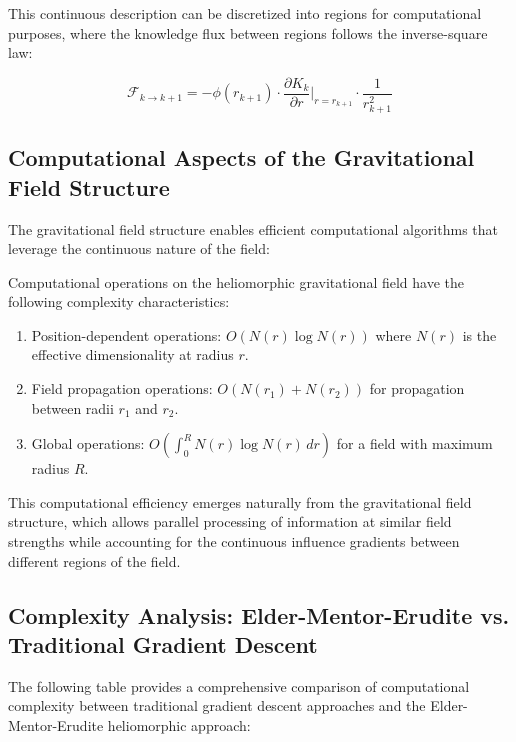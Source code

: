 \begin{definition}
\begin{theorem}
This continuous description can be discretized into regions for computational purposes, where the knowledge flux between regions follows the inverse-square law:

\begin{equation}
\mathcal{F}_{k \to k+1} = -\phi(r_{k+1}) \cdot \frac{\partial K_k}{\partial r}\bigg|_{r=r_{k+1}} \cdot \frac{1}{r_{k+1}^2}
\end{equation}

\subsection{Computational Aspects of the Gravitational Field Structure}

The gravitational field structure enables efficient computational algorithms that leverage the continuous nature of the field:

\begin{theorem}
Computational operations on the heliomorphic gravitational field have the following complexity characteristics:
\begin{enumerate}
    \item Position-dependent operations: $O(N(r) \log N(r))$ where $N(r)$ is the effective dimensionality at radius $r$.
    \item Field propagation operations: $O(N(r_1) + N(r_2))$ for propagation between radii $r_1$ and $r_2$.
    \item Global operations: $O(\int_0^R N(r) \log N(r) \, dr)$ for a field with maximum radius $R$.
\end{enumerate}
\end{theorem}

This computational efficiency emerges naturally from the gravitational field structure, which allows parallel processing of information at similar field strengths while accounting for the continuous influence gradients between different regions of the field.

\subsection{Complexity Analysis: Elder-Mentor-Erudite vs. Traditional Gradient Descent}

The following table provides a comprehensive comparison of computational complexity between traditional gradient descent approaches and the Elder-Mentor-Erudite heliomorphic approach:


\end{theorem}
\end{definition}
